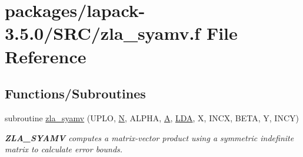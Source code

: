 \hypertarget{zla__syamv_8f}{}\section{packages/lapack-\/3.5.0/\+S\+R\+C/zla\+\_\+syamv.f File Reference}
\label{zla__syamv_8f}
\subsection*{Functions/\+Subroutines}
\begin{DoxyCompactItemize}
\item 
subroutine \hyperlink{group__complex16SYcomputational_gafdde4e07a3bfeddbf09a744d6d4c60d8}{zla\+\_\+syamv} (U\+P\+L\+O, \hyperlink{polmisc_8c_a0240ac851181b84ac374872dc5434ee4}{N}, A\+L\+P\+H\+A, \hyperlink{classA}{A}, \hyperlink{example__user_8c_ae946da542ce0db94dced19b2ecefd1aa}{L\+D\+A}, X, I\+N\+C\+X, B\+E\+T\+A, Y, I\+N\+C\+Y)
\begin{DoxyCompactList}\small\item\em {\bfseries Z\+L\+A\+\_\+\+S\+Y\+A\+M\+V} computes a matrix-\/vector product using a symmetric indefinite matrix to calculate error bounds. \end{DoxyCompactList}\end{DoxyCompactItemize}
